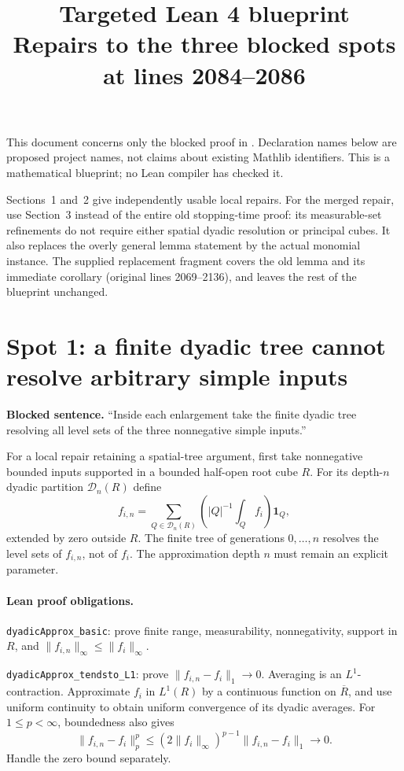 \documentclass[11pt]{article}
\title{Targeted Lean 4 blueprint\\\large Repairs to the three blocked spots at lines 2084--2086}
\author{}
\date{}
\begin{document}
\maketitle
This document concerns only the blocked proof in
.
Declaration names below are proposed project names, not claims about
existing Mathlib identifiers. This is a mathematical blueprint; no Lean
compiler has checked it.

Sections~1 and~2 give independently usable local repairs. For the merged
repair, use Section~3 instead of the entire old stopping-time proof: its
measurable-set refinements do not require either spatial dyadic resolution
or principal cubes. It also replaces the overly general lemma statement
by the actual monomial instance. The supplied replacement fragment covers
the old lemma and its immediate corollary (original lines 2069--2136), and
leaves the rest of the blueprint unchanged.

\section{Spot 1: a finite dyadic tree cannot resolve arbitrary simple inputs}
\textbf{Blocked sentence.} ``Inside each enlargement take the finite dyadic
tree resolving all level sets of the three nonnegative simple inputs.''

For a local repair retaining a spatial-tree argument, first take
nonnegative bounded inputs supported in a bounded half-open root cube $R$.
For its depth-$n$ dyadic partition $\mathcal D_n(R)$ define
\[
 f_{i,n}=\sum_{Q\in\mathcal D_n(R)}
       \left(|Q|^{-1}\int_Q f_i\right)\mathbf1_Q,
\]
extended by zero outside $R$. The finite tree of generations $0,\ldots,n$
resolves the level sets of $f_{i,n}$, not of $f_i$. The approximation depth
$n$ must remain an explicit parameter.

\paragraph{Lean proof obligations.}
\texttt{dyadicApprox\_basic}: prove finite range, measurability,
nonnegativity, support in $R$, and $\|f_{i,n}\|_\infty\leq\|f_i\|_\infty$.

\texttt{dyadicApprox\_tendsto\_L1}: prove
$\|f_{i,n}-f_i\|_1\to0$. Averaging is an $L^1$-contraction. Approximate
$f_i$ in $L^1(R)$ by a continuous function on $\overline R$, and use uniform
continuity to obtain uniform convergence of its dyadic averages. For
$1\leq p<\infty$, boundedness also gives
\[
 \|f_{i,n}-f_i\|_p^p\leq
 (2\|f_i\|_\infty)^{p-1}\|f_{i,n}-f_i\|_1\longrightarrow0.
\]
Handle the zero bound separately.
\end{document}
